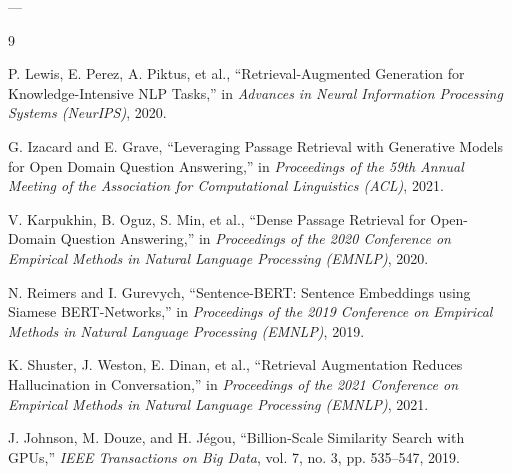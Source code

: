 \documentclass[conference]{IEEEtran}
\begin{document}
---


\begin{thebibliography}{9}

P. Lewis, E. Perez, A. Piktus, et al., ``Retrieval-Augmented Generation for Knowledge-Intensive NLP Tasks,'' in \textit{Advances in Neural Information Processing Systems (NeurIPS)}, 2020.

G. Izacard and E. Grave, ``Leveraging Passage Retrieval with Generative Models for Open Domain Question Answering,'' in \textit{Proceedings of the 59th Annual Meeting of the Association for Computational Linguistics (ACL)}, 2021.

V. Karpukhin, B. Oguz, S. Min, et al., ``Dense Passage Retrieval for Open-Domain Question Answering,'' in \textit{Proceedings of the 2020 Conference on Empirical Methods in Natural Language Processing (EMNLP)}, 2020.

N. Reimers and I. Gurevych, ``Sentence-BERT: Sentence Embeddings using Siamese BERT-Networks,'' in \textit{Proceedings of the 2019 Conference on Empirical Methods in Natural Language Processing (EMNLP)}, 2019.

K. Shuster, J. Weston, E. Dinan, et al., ``Retrieval Augmentation Reduces Hallucination in Conversation,'' in \textit{Proceedings of the 2021 Conference on Empirical Methods in Natural Language Processing (EMNLP)}, 2021.

J. Johnson, M. Douze, and H. J\'egou, ``Billion-Scale Similarity Search with GPUs,'' \textit{IEEE Transactions on Big Data}, vol. 7, no. 3, pp. 535--547, 2019.

\end{thebibliography}
\end{document}
